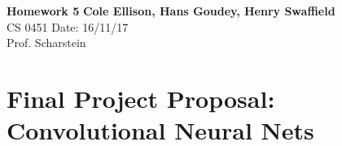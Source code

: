 \documentclass[a4paper, 11pt]{article}
\begin{document}
\noindent
\large\textbf{Homework 5} \hfill \textbf{Cole Ellison, Hans Goudey, Henry Swaffield} \\
\normalsize CS 0451 \hfill Date: 16/11/17\\
Prof. Scharstein \hfill \\

\section*{Final Project Proposal: Convolutional Neural Nets}

\end{document}
